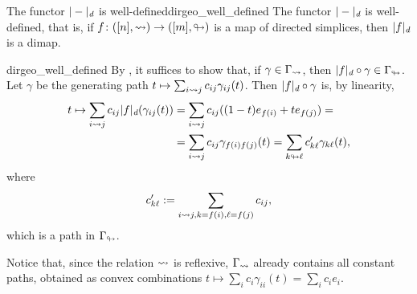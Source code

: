 \begin{clem}{The functor \( |-|_\textit{d} \) is well-defined}{dirgeo_well_defined}
	The functor \( |-|_\textit{d} \) is well-defined, that is, if \( f\colon ([n], \rightsquigarrow) \to ([m], \looparrowright) \) is a map of directed simplices, then \( |f|_\textit{d} \) is a dimap.
\end{clem}
\begin{lemproof}{dirgeo_well_defined}
By , it suffices to show that, if \( \gamma \in \Gamma_\rightsquigarrow \), then \( |f|_\textit{d} \circ \gamma \in \Gamma_\looparrowright \).
Let \( \gamma \) be the generating path \( t \mapsto \sum_{i\rightsquigarrow j} c_{ij} \gamma_{ij}(t) \).
Then \( |f|_\textit{d} \circ \gamma \) is, by linearity,
\begin{align*}
	t \mapsto \sum_{i\rightsquigarrow j} c_{ij} |f|_\textit{d}(\gamma_{ij}(t)) 
	& = \sum_{i\rightsquigarrow j} c_{ij} ((1-t) e_{f(i)} + te_{f(j)}) = \\
	& = \sum_{i\rightsquigarrow j} c_{ij} \gamma_{f(i)f(j)}(t) = \sum_{k\looparrowright\ell} c'_{k\ell} \gamma_{k\ell}(t),
\end{align*}
where
\begin{equation*}
	c'_{k\ell} := \sum_{i\rightsquigarrow j, k=f(i), \ell=f(j)} c_{ij},
\end{equation*}
which is a path in \( \Gamma_\looparrowright \).
\end{lemproof}

Notice that, since the relation \( \rightsquigarrow \) is reflexive, \( \Gamma_\rightsquigarrow \) already contains all constant paths, obtained as convex combinations \( t \mapsto \sum_{i} c_i \gamma_{ii}(t) = \sum_{i} c_i e_i \).
